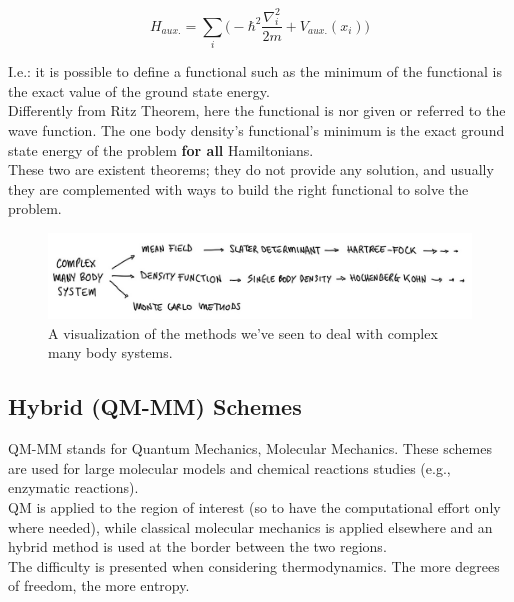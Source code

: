  \[
 H_{aux.} = \sum_i \bigg(-\hbar^2 \frac{\nabla_i^2}{2m} + V_{aux.}(x_i) \bigg)
 \]
 
I.e.: it is possible to define a functional such as the minimum of the functional is the exact value of the ground state energy. \\
Differently from Ritz Theorem, here the functional is nor given or referred to the wave function. 
The one body density's functional's minimum is the exact ground state energy of the problem \textbf{for all} Hamiltonians.\\

These two are existent theorems; they do not provide any solution, and usually they are complemented with ways to build the right functional to solve the problem.\\
\begin{figure}[htbp!]
	\centering
	\includegraphics[scale=0.30]{img_15}
	\caption{A visualization of the methods we've seen to deal with complex many body systems.}
\end{figure}

\subsection{Hybrid (QM-MM) Schemes}
QM-MM stands for Quantum Mechanics, Molecular Mechanics. 
These schemes are used for large molecular models and chemical reactions studies (e.g., enzymatic reactions).\\
QM is applied to the region of interest (so to have the computational effort only where needed),  while classical molecular mechanics is applied elsewhere and an hybrid method is used at the border between the two regions.\\
The difficulty is presented when considering thermodynamics. The more degrees of freedom, the more entropy.\\
